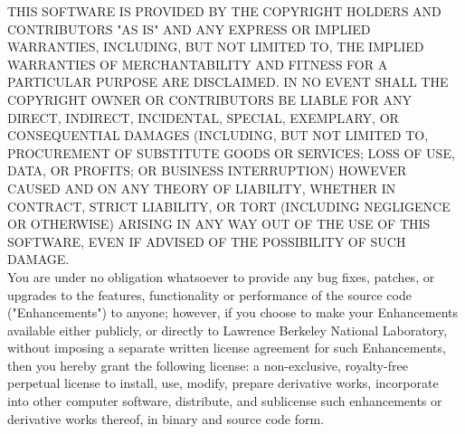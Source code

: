 THIS SOFTWARE IS PROVIDED BY THE COPYRIGHT HOLDERS AND CONTRIBUTORS "AS IS" AND ANY EXPRESS OR IMPLIED WARRANTIES, INCLUDING, BUT NOT LIMITED TO, THE IMPLIED WARRANTIES OF MERCHANTABILITY AND FITNESS FOR A PARTICULAR PURPOSE ARE DISCLAIMED. IN NO EVENT SHALL THE COPYRIGHT OWNER OR CONTRIBUTORS BE LIABLE FOR ANY DIRECT, INDIRECT, INCIDENTAL, SPECIAL, EXEMPLARY, OR CONSEQUENTIAL DAMAGES (INCLUDING, BUT NOT LIMITED TO, PROCUREMENT OF SUBSTITUTE GOODS OR SERVICES; LOSS OF USE, DATA, OR PROFITS; OR BUSINESS INTERRUPTION) HOWEVER CAUSED AND ON ANY THEORY OF LIABILITY, WHETHER IN CONTRACT, STRICT LIABILITY, OR TORT (INCLUDING NEGLIGENCE OR OTHERWISE) ARISING IN ANY WAY OUT OF THE USE OF THIS SOFTWARE, EVEN IF ADVISED OF THE POSSIBILITY OF SUCH DAMAGE.\\

You are under no obligation whatsoever to provide any bug fixes, patches, or upgrades to the features, functionality or performance of the source code ("Enhancements") to anyone; however, if you choose to make your Enhancements available either publicly, or directly to Lawrence Berkeley National Laboratory, without imposing a separate written license agreement for such Enhancements, then you hereby grant the following license: a  non-exclusive, royalty-free perpetual license to install, use, modify, prepare derivative works, incorporate into other computer software, distribute, and sublicense such enhancements or derivative works thereof, in binary and source code form.

